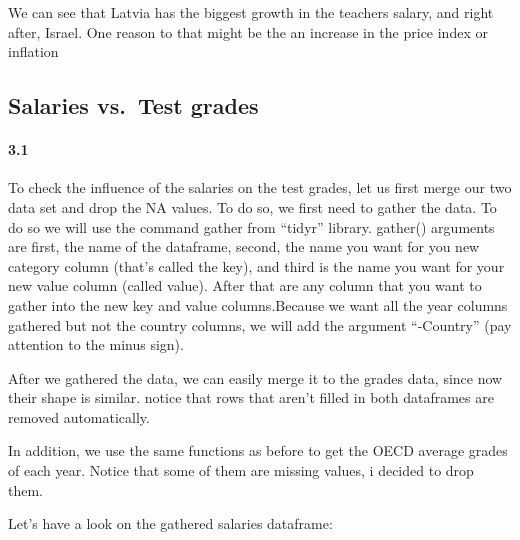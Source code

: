 \documentclass[]{article}
\newenvironment{Shaded}{\begin{snugshade}}{\end{snugshade}}
\newcommand{\KeywordTok}[1]{\textcolor[rgb]{0.13,0.29,0.53}{\textbf{#1}}}
\newcommand{\DataTypeTok}[1]{\textcolor[rgb]{0.13,0.29,0.53}{#1}}
\newcommand{\StringTok}[1]{\textcolor[rgb]{0.31,0.60,0.02}{#1}}
\newcommand{\OtherTok}[1]{\textcolor[rgb]{0.56,0.35,0.01}{#1}}
\newcommand{\OperatorTok}[1]{\textcolor[rgb]{0.81,0.36,0.00}{\textbf{#1}}}
\newcommand{\NormalTok}[1]{#1}
\let\oldparagraph\paragraph
\renewcommand{\paragraph}[1]{\oldparagraph{#1}\mbox{}}
\begin{document}
We can see that Latvia has the biggest growth in the teachers salary,
and right after, Israel. One reason to that might be the an increase in
the price index or inflation

\subsection{Salaries vs.~Test grades}\label{salaries-vs.test-grades}

\paragraph{3.1}\label{section-10}

To check the influence of the salaries on the test grades, let us first
merge our two data set and drop the NA values. To do so, we first need
to gather the data. To do so we will use the command gather from
``tidyr'' library. gather() arguments are first, the name of the
dataframe, second, the name you want for you new category column (that's
called the key), and third is the name you want for your new value
column (called value). After that are any column that you want to gather
into the new key and value columns.Because we want all the year columns
gathered but not the country columns, we will add the argument
``-Country'' (pay attention to the minus sign).

After we gathered the data, we can easily merge it to the grades data,
since now their shape is similar. notice that rows that aren't filled in
both dataframes are removed automatically.

In addition, we use the same functions as before to get the OECD average
grades of each year. Notice that some of them are missing values, i
decided to drop them.

Let's have a look on the gathered salaries dataframe:

\begin{Shaded}
\end{Shaded}
\end{document}
